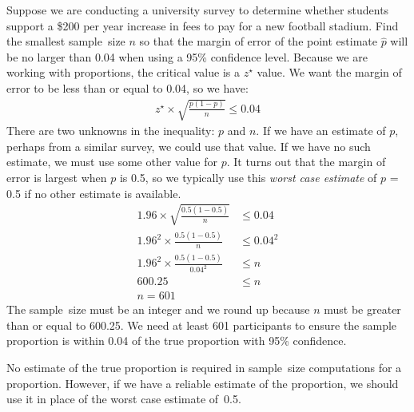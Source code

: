 \begin{examplewrap}
\begin{nexample}{Suppose we are conducting a university survey to determine whether students support a \$200 per year increase in fees to pay for a new football stadium.  Find the smallest sample~size $n$ so that the margin of error of the point estimate $\hat{p}$ will be no larger than 0.04 when using a 95\% confidence level.}
Because we are working with proportions, the critical value is a $z^{\star}$ value.  We want the margin of error to be less than or equal to 0.04, so we have:
\begin{align*}
z^{\star}\times \sqrt{\frac{p(1-p)}{n}} \leq 0.04
\end{align*}
There are two unknowns in the inequality: $p$ and $n$. If we have an estimate of $p$, perhaps from a similar survey, we could use that value. If we have no such estimate, we must use some other value for $p$. It turns out that the margin of error is largest when $p$ is 0.5, so we typically use this \emph{worst case estimate} of $p$ = 0.5 if no other estimate is available.
\begin{align*}
	1.96\times \sqrt{\frac{0.5(1-0.5)}{n}} &\leq 0.04 \\
	1.96^2\times \frac{0.5(1-0.5)}{n} &\leq 0.04^2 \\
	1.96^2\times \frac{0.5(1-0.5)}{0.04^2} &\leq n \\
	600.25 &\leq n \\
	n=601
\end{align*}
The sample~size must be an integer and we round up because $n$ must be greater than or equal to 600.25. We need at least 601 participants to ensure the sample proportion is within 0.04 of the true proportion with 95\% confidence.
\end{nexample}
\end{examplewrap}

No estimate of the true proportion is required in sample~size computations for a proportion. However, if we have a reliable estimate of the proportion, we should use it in place of the worst case estimate of~0.5.



 


